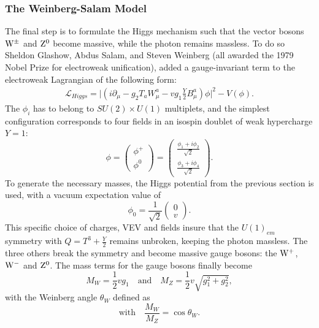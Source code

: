 \subsubsection{The Weinberg-Salam Model}
The final step is to formulate the Higgs mechanism such that the vector bosons $\mathrm{W}^{\pm}$ and $\mathrm{Z}^{0}$ become massive, while the photon remains massless. To do so Sheldon Glashow, Abdus Salam, and Steven Weinberg (all awarded the 1979 Nobel Prize for electroweak unification), added a gauge-invariant term to the electroweak Lagrangian of the following form:
 \begin{align}
   \label{eq:theory:higgsmass}
  \mathcal{L}_{Higgs}= \big|(i\partial_{\mu} - g_2 T_a W_{\mu}^a -vg_1 \frac{Y}{2} B_{\mu}^a) \phi\big| ^2-V(\phi).
 \end{align}
The $\phi_i$ has to belong to $SU(2) \times U(1)$ multiplets, and the simplest configuration corresponds to four fields in an isospin doublet of weak hypercharge $Y=1$:
\begin{equation}
\phi =  \begin{pmatrix} \phi^{+} \\ \phi^{0} \end{pmatrix}= \begin{pmatrix} \frac{\phi_1+i\phi_2}{\sqrt{2}} \\ \frac{\phi_3+i\phi_4}{\sqrt{2}}\end{pmatrix}.
\end{equation}
To generate the necessary masses, the Higgs potential from the previous section is used, with a vacuum expectation value of
\begin{equation}
\phi_0 = \frac{1}{\sqrt{2}}  \begin{pmatrix} 0 \\ v \end{pmatrix}.
\end{equation}
This specific choice of charges, VEV and fields insure that the $U(1)_{em}$ symmetry with $Q=T^3+\frac{Y}{2}$ remains unbroken, keeping the photon massless. The three others break the symmetry and become massive gauge bosons: the $\mathrm{W}^{+}$, $\mathrm{W}^{-}$ and $\mathrm{Z}^{0}$. The mass terms for the gauge bosons finally become
\begin{equation}
M_W=\frac{1}{2}vg_1 \quad \textrm{and} \quad M_Z =\frac{1}{2}v\sqrt{g_1^2+g_2^2},
\end{equation}
with the Weinberg angle $\theta_W$ defined as
\begin{equation}
\textrm{with}\quad\frac{M_W}{M_Z}=\cos \theta_W.
\end{equation}
